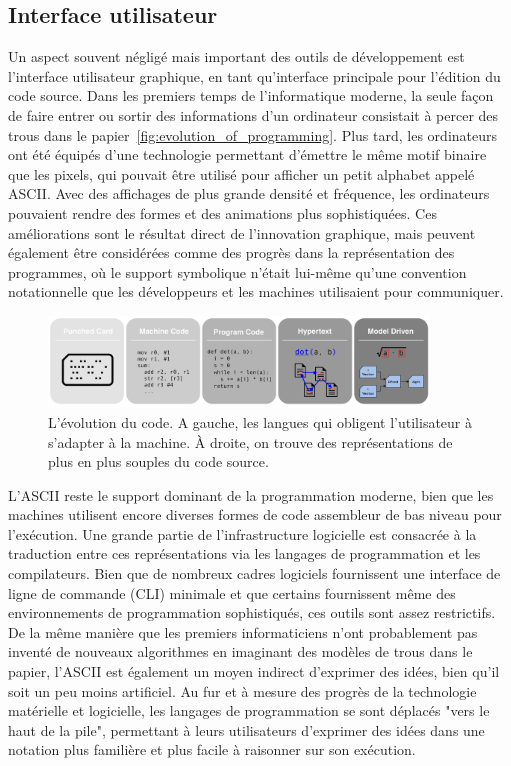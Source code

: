 \subsection{Interface utilisateur}

Un aspect souvent négligé mais important des outils de développement est l'interface utilisateur graphique, en tant qu'interface principale pour l'édition du code source. Dans les premiers temps de l'informatique moderne, la seule façon de faire entrer ou sortir des informations d'un ordinateur consistait à percer des trous dans le papier~\autoref{fig:evolution_of_programming}. Plus tard, les ordinateurs ont été équipés d'une technologie permettant d'émettre le même motif binaire que les pixels, qui pouvait être utilisé pour afficher un petit alphabet appelé ASCII. Avec des affichages de plus grande densité et fréquence, les ordinateurs pouvaient rendre des formes et des animations plus sophistiquées. Ces améliorations sont le résultat direct de l'innovation graphique, mais peuvent également être considérées comme des progrès dans la représentation des programmes, où le support symbolique n'était lui-même qu'une convention notationnelle que les développeurs et les machines utilisaient pour communiquer.

\begin{figure}
\center
\includegraphics[width=0.90\textwidth]{../figures/progress_in_program.png}
\caption{L'évolution du code. A gauche, les langues qui obligent l'utilisateur à s'adapter à la machine. À droite, on trouve des représentations de plus en plus souples du code source.}
\label{fig:evolution_of_programming}
\end{figure}

L'ASCII reste le support dominant de la programmation moderne, bien que les machines utilisent encore diverses formes de code assembleur de bas niveau pour l'exécution. Une grande partie de l'infrastructure logicielle est consacrée à la traduction entre ces représentations via les langages de programmation et les compilateurs. Bien que de nombreux cadres logiciels fournissent une interface de ligne de commande (CLI) minimale et que certains fournissent même des environnements de programmation sophistiqués, ces outils sont assez restrictifs. De la même manière que les premiers informaticiens n'ont probablement pas inventé de nouveaux algorithmes en imaginant des modèles de trous dans le papier, l'ASCII est également un moyen indirect d'exprimer des idées, bien qu'il soit un peu moins artificiel. Au fur et à mesure des progrès de la technologie matérielle et logicielle, les langages de programmation se sont déplacés "vers le haut de la pile", permettant à leurs utilisateurs d'exprimer des idées dans une notation plus familière et plus facile à raisonner sur son exécution.

